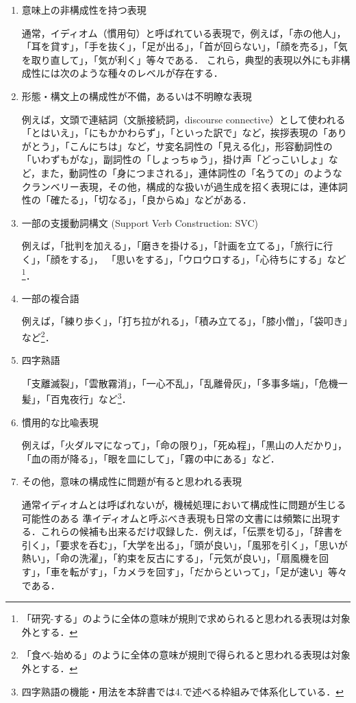 \documentclass[japanese]{jnlp_1.4}
\begin{document}
\begin{enumerate}
\item 意味上の非構成性を持つ表現

通常，イディオム（慣用句）と呼ばれている表現で，例えば，「赤の他人」，「耳を貸す」，「手を抜く」，「足が出る」，「首が回らない」，「顔を売る」，「気を取り直して」，「気が利く」等々である．
これら，典型的表現以外にも非構成性には次のような種々のレベルが存在する．

\item 形態・構文上の構成性が不備，あるいは不明瞭な表現

例えば，文頭で連結詞（文脈接続詞，discourse connective）として使われる「とはいえ」，「にもかかわらず」，「といった訳で」など，挨拶表現の「ありがとう」，「こんにちは」など，サ変名詞性の「見える化」，形容動詞性の「いわずもがな」，副詞性の「しょっちゅう」，掛け声「どっこいしょ」など，また，動詞性の「身につまされる」，連体詞性の「名うての」のようなクランベリー表現，その他，構成的な扱いが過生成を招く表現には，連体詞性の「確たる」，「切なる」，「良からぬ」などがある．

\item 一部の支援動詞構文 (Support Verb Construction: SVC)

例えば，「批判を加える」，「磨きを掛ける」，「計画を立てる」，「旅行に行く」，「顔をする」，
「思いをする」，「ウロウロする」，「心待ちにする」など\footnote{「研究-する」のように全体の意味が規則で求められると思われる表現は対象外とする．}． 

\item 一部の複合語

例えば，「練り歩く」，「打ち拉がれる」，「積み立てる」，「膝小僧」，「袋叩き」など\footnote{「食べ-始める」のように全体の意味が規則で得られると思われる表現は対象外とする．}． 

\item 四字熟語

「支離滅裂」，「雲散霧消」，「一心不乱」，「乱離骨灰」，「多事多端」，「危機一髪」，「百鬼夜行」など\footnote{四字熟語の機能・用法を本辞書では4.で述べる枠組みで体系化している．}． 

\item 慣用的な比喩表現

例えば，「火ダルマになって」，「命の限り」，「死ぬ程」，「黒山の人だかり」，「血の雨が降る」，「眼を皿にして」，「霧の中にある」など．

\item その他，意味の構成性に問題が有ると思われる表現

通常イディオムとは呼ばれないが，機械処理において構成性に問題が生じる可能性のある
準イディオムと呼ぶべき表現も日常の文書には頻繁に出現する．これらの候補も出来るだけ収録した．例えば，「伝票を切る」，「辞書を引く」，「要求を呑む」，「大学を出る」，「頭が良い」，「風邪を引く」，「思いが熱い」，「命の洗濯」，「約束を反古にする」，「元気が良い」，「扇風機を回す」，「車を転がす」，「カメラを回す」，「だからといって」，「足が速い」等々である．
\end{enumerate}
\end{document}
